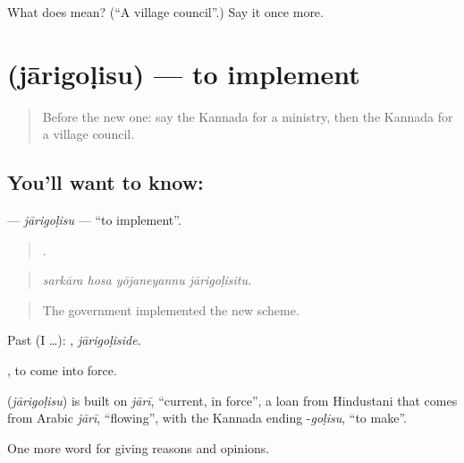 \begin{tcolorbox}[breakable,colback=teal!4,colframe=teal!35!black,title={Before you move on}]
What does  mean? (\textquotedblleft{}A village council\textquotedblright{}.) Say it once more.
\end{tcolorbox}
\section[\texorpdfstring{\kn{ಜಾರಿಗೊಳಿಸು} (jārigoḷisu)}{ಜಾರಿಗೊಳಿಸು (jārigoḷisu)}]{ (jārigoḷisu) — to implement}

\label{lesson:KA-C395-jarigolisu}



\begin{quote}
Before the new one: say the Kannada for a ministry, then the Kannada for a village council.
\end{quote}

\subsection*{You'll want to know: }
\textbf{} — \emph{jārigoḷisu} — \textquotedblleft{}to implement\textquotedblright{}.

\begin{quote}
   .
\end{quote}

\begin{quote}
\emph{sarkāra hosa yōjaneyannu jārigoḷisitu.}
\end{quote}

\begin{quote}
The government implemented the new scheme.
\end{quote}

Past (I …): , \emph{jārigoḷiside}.

 , to come into force.

\begin{cousinweb}
\textbf{} (\emph{jārigoḷisu}) is built on \emph{jārī}, \textquotedblleft{}current, in force\textquotedblright{}, a loan from Hindustani that comes from Arabic \emph{jārī}, \textquotedblleft{}flowing\textquotedblright{}, with the Kannada ending -\emph{goḷisu}, \textquotedblleft{}to make\textquotedblright{}.
\end{cousinweb}

\begin{grammarlens}[title={What you've built}]
One more word for giving reasons and opinions.
\end{grammarlens}

